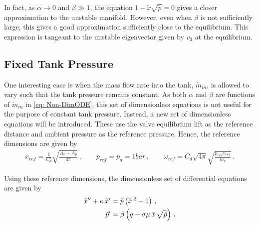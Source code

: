 In fact, as $\alpha \rightarrow 0$ and $\beta \gg 1$, the equation $1 - \tilde{x} \sqrt{\tilde{p}} = 0$ gives a closer approximation to the unstable manifold. However, even when $\beta$ is not sufficiently large, this gives a good approximation sufficiently close to the equilibrium. This expression is tangeant to the unstable eigenvector given by $v_3$ at the equilibrium.

% 

\subsection{Fixed Tank Pressure}

One interesting case is when the mass flow rate into the tank, $\dot{m}_{in}$, is allowed to vary such that the tank pressure remains constant. As both $\alpha$ and $\beta$ are functions of $\dot{m}_{in}$ in \cref{eq: Non-DimODE}, this set of dimensionless equations is not useful for the purpose of constant tank pressure. Instead, a new set of dimensionless equations will be introduced. These use the valve equilibrium lift as the reference distance and ambient pressure as the reference pressure. Hence, the reference dimensions are given by
~
\begin{equation*}
\begin{split}
    x_{ref} = \frac{1}{C_d} \sqrt{\frac{A_v - A_p}{4 \pi}}
    \, , \qquad
    p_{ref} = p_a = 1 \si{bar}
    \, , \qquad
    \omega_{ref} = C_d \sqrt{4 \pi} \sqrt{\frac{p_{ref} x_{ref}}{m_v}} \, .
\end{split}
\end{equation*}

Using these reference dimensions, the dimensionless set of differential equations are given by
~
\begin{equation} \label{eq: AltNonDim}
\begin{split}
    \tilde{x}{''} + \kappa \, \tilde{x}{'} &=  \tilde{p} \left( \tilde{x}^{\;2}  - 1 \right) \, , \\
    \tilde{p}{'} &= \beta \left( q - \sigma \mu \, \tilde{x} \, \sqrt{\tilde{p}} \right) \, .
\end{split}
\end{equation}

